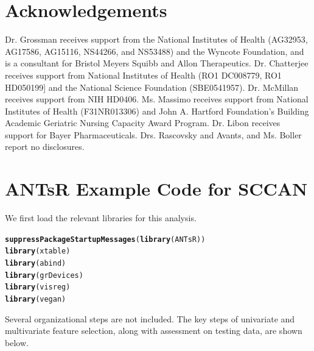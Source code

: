 \documentclass[preprint,authoryear,12pt]{elsarticle}
\makeatletter
\newcommand{\hlfunctioncall}[1]{\textcolor[rgb]{0.501960784313725,0,0.329411764705882}{\textbf{#1}}}%
\newenvironment{kframe}{%
 \def\at@end@of@kframe{}%
 \ifinner\ifhmode%
  \def\at@end@of@kframe{\end{minipage}}%
  \begin{minipage}{\columnwidth}%
 \fi\fi%
 \def\FrameCommand##1{\hskip\@totalleftmargin \hskip-\fboxsep
 \colorbox{shadecolor}{##1}\hskip-\fboxsep
     \hskip-\linewidth \hskip-\@totalleftmargin \hskip\columnwidth}%
 \MakeFramed {\advance\hsize-\width
   \@totalleftmargin\z@ \linewidth\hsize
   \@setminipage}}%
 {\par\unskip\endMakeFramed%
 \at@end@of@kframe}
\newenvironment{knitrout}{}{} %
\makeatother
\begin{document}
\section{Acknowledgements}
Dr. Grossman receives support from the National Institutes of Health (AG32953, AG17586, AG15116, NS44266, and NS53488) and the Wyncote Foundation, and is a consultant for Bristol Meyers Squibb and Allon Therapeutics.  Dr. Chatterjee receives support from National Institutes of Health (RO1 DC008779, RO1 HD050199] and the National Science Foundation (SBE0541957).  Dr. McMillan receives support from NIH HD0406.  Ms. Massimo receives support from National Institutes of Health (F31NR013306) and John A. Hartford Foundation's Building Academic Geriatric Nursing Capacity Award Program.  Dr. Libon receives support for Bayer Pharmaceuticals.  Drs. Rascovsky and Avants, and Ms. Boller report no disclosures.

\section{ANTsR Example Code for SCCAN}
\label{sec:code}

We first load the relevant libraries for this analysis.

\begin{knitrout}
\color{fgcolor}\begin{kframe}
\begin{alltt}
\hlfunctioncall{suppressPackageStartupMessages}(\hlfunctioncall{library}(ANTsR))
\hlfunctioncall{library}(xtable)
\hlfunctioncall{library}(abind)
\hlfunctioncall{library}(grDevices)
\hlfunctioncall{library}(visreg)
\hlfunctioncall{library}(vegan)
\end{alltt}
\end{kframe}
\end{knitrout}


Several organizational steps are not included.  The key steps of univariate and multivariate feature selection, along with assessment on testing data, are shown below. 
\end{document}
